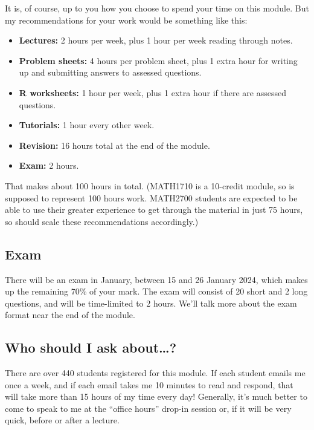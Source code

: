 \documentclass[
  a4paper,
]{book}
\providecommand{\tightlist}{%
  \setlength{\itemsep}{0pt}\setlength{\parskip}{0pt}}
\theoremstyle{definition}
\theoremstyle{definition}
\theoremstyle{definition}
\theoremstyle{definition}
\theoremstyle{remark}
\begin{document}
It is, of course, up to you how you choose to spend your time on this module. But my recommendations for your work would be something like this:

\begin{itemize}
\tightlist
\item
  \textbf{Lectures:} 2 hours per week, plus 1 hour per week reading through notes.
\item
  \textbf{Problem sheets:} 4 hours per problem sheet, plus 1 extra hour for writing up and submitting answers to assessed questions.
\item
  \textbf{R worksheets:} 1 hour per week, plus 1 extra hour if there are assessed questions.
\item
  \textbf{Tutorials:} 1 hour every other week.
\item
  \textbf{Revision:} 16 hours total at the end of the module.
\item
  \textbf{Exam:} 2 hours.
\end{itemize}

That makes about 100 hours in total. (MATH1710 is a 10-credit module, so is supposed to represent 100 hours work. MATH2700 students are expected to be able to use their greater experience to get through the material in just 75 hours, so should scale these recommendations accordingly.)

\hypertarget{exam}{%
\subsection*{Exam}\label{exam}}

There will be an exam in January, between 15 and 26 January 2024, which makes up the remaining 70\% of your mark. The exam will consist of 20 short and 2 long questions, and will be time-limited to 2 hours. We'll talk more about the exam format near the end of the module.

\hypertarget{ask}{%
\subsection*{Who should I ask about\ldots?}\label{ask}}

There are over 440 students registered for this module. If each student emails me once a week, and if each email takes me 10 minutes to read and respond, that will take more than 15 hours of my time every day! Generally, it's much better to come to speak to me at the ``office hours'' drop-in session or, if it will be very quick, before or after a lecture.
\end{document}
